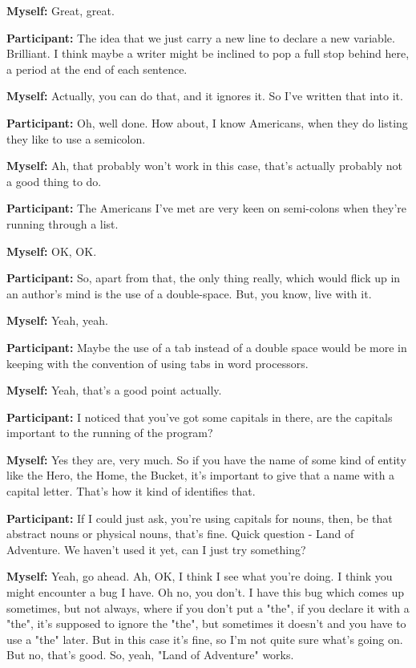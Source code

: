 \documentclass[11pt]{report}
\newcommand{\llabel}[1]{\hypertarget{llineno:#1}{\linelabel{#1}}}
\begin{document}
\begin{linenumbers}
\textbf{Myself:} Great, great.

\textbf{Participant:} The idea that we just carry a new line to declare a new
variable. Brilliant. I think maybe a writer might be inclined to pop a full stop
behind here, a period at the end of each sentence.

\textbf{Myself:} Actually, you can do that, and it ignores it. So I've written that into it.

\textbf{Participant:} Oh, well done. How about, I know Americans, when they do listing they like to use a semicolon.

\textbf{Myself:} Ah, that probably won't work in this case, that's actually probably not a good thing to do.

\textbf{Participant:} The Americans I've met are very keen on semi-colons when they're running through a list.

\textbf{Myself:} OK, OK.

\textbf{Participant:} So, apart from that, the only thing really, which would flick up in an author's mind is the use of a double-space. But, you know, live with it.

\textbf{Myself:} Yeah, yeah.

\textbf{Participant:} Maybe the use of a tab instead of a double space would be more in keeping with the convention of using tabs in word processors.

\textbf{Myself:} Yeah, that's a good point actually.

\textbf{Participant:} I noticed that you've got some capitals in there, are the capitals important to the running of the program?\llabel{lne:syntax5b}

\textbf{Myself:} Yes they are, very much. So if you have the name of some kind of entity like the Hero, the Home, the Bucket, it's important to give that a name with a capital letter. That's how it kind of identifies that.

\textbf{Participant:} If I could just ask, you're using capitals for nouns, then, be that abstract nouns or physical nouns, that's fine. Quick question - Land of Adventure. We haven't used it yet, can I just try something?

\textbf{Myself:} Yeah, go ahead. Ah, OK, I think I see what you're doing. I
think you might encounter a bug I have. Oh no, you don't. I have this bug which
comes up sometimes, but not always, where if you don't put a "the", if you
declare it with a "the", it's supposed to ignore the "the", but sometimes it
doesn't and you have to use a "the" later. But in this case it's fine, so I'm
not quite sure what's going on. But no, that's good. So, yeah, "Land of
Adventure" works.\llabel{lne:syntax3b}


\end{linenumbers}
\end{document}
